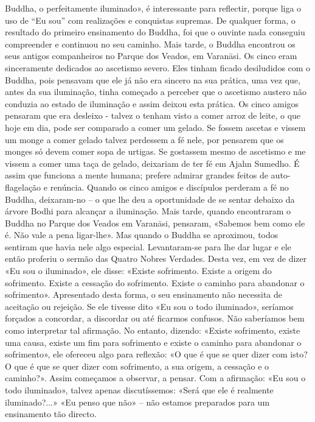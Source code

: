 Buddha, o perfeitamente iluminado», é interessante para
reflectir, porque liga o uso de “Eu sou” com realizações e
conquistas supremas. De qualquer forma, o resultado do
primeiro ensinamento do Buddha, foi que o ouvinte nada conseguiu compreender e continuou no seu caminho.
Mais tarde, o Buddha encontrou os seus antigos companheiros no Parque dos Veados, em Varanāsi. Os cinco eram
sinceramente dedicados ao ascetismo severo. Eles tinham
ficado desiludidos com o Buddha, pois pensavam que ele já
não era sincero na sua prática, uma vez que, antes da sua iluminação, tinha começado a perceber que o ascetismo austero
não conduzia ao estado de iluminação e assim deixou esta
prática. Os cinco amigos pensaram que era desleixo - talvez o
tenham visto a comer arroz de leite, o que hoje em dia, pode
ser comparado a comer um gelado. Se fossem ascetas e vissem um monge a comer gelado talvez perdessem a fé nele,
por pensarem que os monges só devem comer sopa de urtigas.
Se gostassem mesmo de ascetismo e me vissem a comer
uma taça de gelado, deixariam de ter fé em Ajahn Sumedho.
É assim que funciona a mente humana; prefere admirar
grandes feitos de auto-flagelação e renúncia.
Quando os cinco amigos e discípulos perderam a fé no
Buddha, deixaram-no – o que lhe deu a oportunidade de se
sentar debaixo da árvore Bodhi para alcançar a iluminação.
Mais tarde, quando encontraram o Buddha no Parque dos
Veados em Varanāsi, pensaram, «Sabemos bem como ele é.
Não vale a pena ligar-lhe». Mas quando o Buddha se aproximou, todos sentiram que havia nele algo especial.
Levantaram-se para lhe dar lugar e ele então proferiu o sermão das Quatro Nobres Verdades.
Desta vez, em vez de dizer «Eu sou o iluminado», ele
disse: «Existe sofrimento. Existe a origem do sofrimento.
Existe a cessação do sofrimento. Existe o caminho para abandonar o sofrimento». Apresentado desta forma, o seu ensinamento não necessita de aceitação ou rejeição. Se ele tivesse
dito «Eu sou o todo iluminado», seríamos forçados a concordar, a discordar ou até ficarmos confusos. Não saberíamos
bem como interpretar tal afirmação. No entanto, dizendo:
«Existe sofrimento, existe uma causa, existe um fim para
sofrimento e existe o caminho para abandonar o sofrimento»,
ele ofereceu algo para reflexão: «O que é que se quer dizer
com isto? O que é que se quer dizer com sofrimento, a sua
origem, a cessação e o caminho?».
Assim começamos a observar, a pensar. Com a afirmação: «Eu sou o todo iluminado», talvez apenas discutíssemos:
«Será que ele é realmente iluminado?...» «Eu penso que não»
– não estamos preparados para um ensinamento tão directo.
